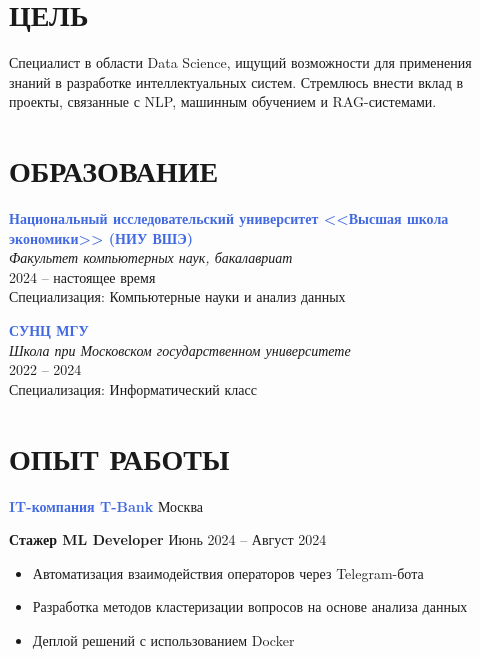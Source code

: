 \documentclass[margin]{res}
\begin{document}
\name{\textcolor{royalblue}{ШКУЛЕВА КСЕНИЯ}}
\address{
    Москва \\
    \href{mailto:ksshkuleva@gmail.com}{ksshkuleva@gmail.com} \\ 
    +7 (965) 178-5997 \\
    GitHub: \href{https://github.com/Kseniiashk}{github.com/Kseniiashk} \\
    Codeforces: \href{https://codeforces.com/profile/KseniaShk}{codeforces.com/profile/KseniaShk} %
}

\begin{resume}

{\color{royalblue} \section{ЦЕЛЬ}}
Специалист в области Data Science, ищущий возможности для применения знаний в разработке интеллектуальных систем. Стремлюсь внести вклад в проекты, связанные с NLP, машинным обучением и RAG-системами.

{\color{royalblue} \section{ОБРАЗОВАНИЕ}}
\textcolor{royalblue}{\textbf{Национальный исследовательский университет <<Высшая школа экономики>> (НИУ ВШЭ)}}\\
{\sl Факультет компьютерных наук, бакалавриат}\\
2024 -- настоящее время\\
Специализация: Компьютерные науки и анализ данных

\textcolor{royalblue}{\textbf{СУНЦ МГУ}}\\
{\sl Школа при Московском государственном университете}\\
2022 -- 2024\\
Специализация: Информатический класс

{\color{royalblue} \section{ОПЫТ РАБОТЫ}}

\vspace{0.5em}
\textbf{\textcolor{royalblue}{IT-компания T-Bank}} \hfill Москва

\textbf{Стажер ML Developer} \hfill Июнь 2024 -- Август 2024
\begin{itemize}[leftmargin=*,topsep=0pt,itemsep=0pt,parsep=0pt]
    \item Автоматизация взаимодействия операторов через Telegram-бота
    \item Разработка методов кластеризации вопросов на основе анализа данных
    \item Деплой решений с использованием Docker
\end{itemize}


\end{resume}
\end{document}

